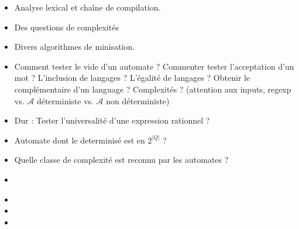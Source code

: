 \documentclass{agregfiche}
\begin{document}
\secidees
\begin{itemize}
\item Analyse lexical et chaîne de compilation.
\item Des questions de complexités
\item Divers algorithmes de minisation.
\end{itemize}


\secquestionsclassiques
\begin{itemize}
\item Comment tester le vide d'un automate ? Commenter tester l'acceptation d'un mot ? L'inclusion de langages ? L'égalité de langages ? Obtenir le complémentaire d'un language ? Complexités ? (attention aux inputs, regexp vs. $\mathcal{A}$ déterministe vs. $\mathcal{A}$ non déterministe)
\item Dur : Tester l'universalité d'une expression rationnel ?
\item Automate dont le determinisé est en $2^{|Q|}$ ?
\item Quelle classe de complexité est reconnu par les automates ?
\end{itemize}

\secreferences
\begin{itemize}
\item 
\end{itemize}

\secdev
\begin{itemize}
\item 
\item 
\item 

\end{itemize}
\end{document}
